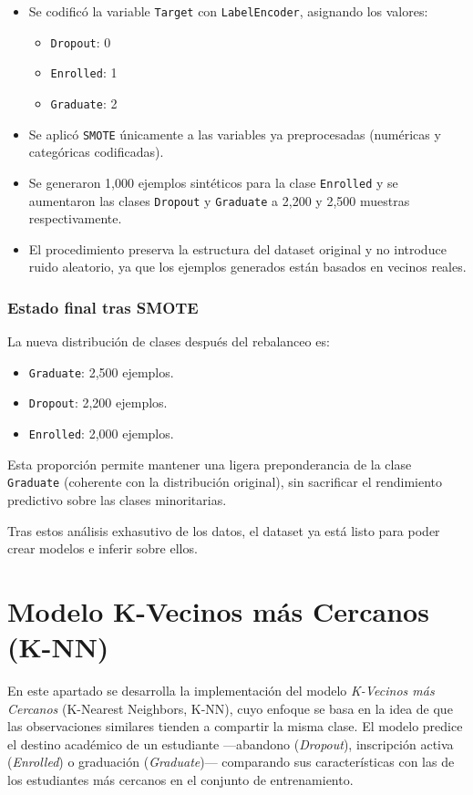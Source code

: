 \documentclass{report}[14pt]
\begin{document}
\begin{itemize}
    \item Se codificó la variable \texttt{Target} con \texttt{LabelEncoder}, asignando los valores:
    \begin{itemize}
        \item \texttt{Dropout}: 0
        \item \texttt{Enrolled}: 1
        \item \texttt{Graduate}: 2
    \end{itemize}
    \item Se aplicó \texttt{SMOTE} únicamente a las variables ya preprocesadas (numéricas y categóricas codificadas).
    \item Se generaron 1,000 ejemplos sintéticos para la clase \texttt{Enrolled} y se aumentaron las clases \texttt{Dropout} y \texttt{Graduate} a 2,200 y 2,500 muestras respectivamente.
    \item El procedimiento preserva la estructura del dataset original y no introduce ruido aleatorio, ya que los ejemplos generados están basados en vecinos reales.
\end{itemize}

\subsection{Estado final tras SMOTE}

La nueva distribución de clases después del rebalanceo es:

\begin{itemize}
    \item \texttt{Graduate}: 2,500 ejemplos.
    \item \texttt{Dropout}: 2,200 ejemplos.
    \item \texttt{Enrolled}: 2,000 ejemplos.
\end{itemize}

Esta proporción permite mantener una ligera preponderancia de la clase \texttt{Graduate} (coherente con la distribución original), sin sacrificar el rendimiento predictivo sobre las clases minoritarias.

Tras estos análisis exhasutivo de los datos, el dataset ya está listo para poder crear modelos e inferir sobre ellos.
\chapter{Modelo K-Vecinos más Cercanos (K-NN)}

En este apartado se desarrolla la implementación del modelo \textit{K-Vecinos más Cercanos} (K-Nearest Neighbors, K-NN), cuyo enfoque se basa en la idea de que las observaciones similares tienden a compartir la misma clase. El modelo predice el destino académico de un estudiante —abandono (\textit{Dropout}), inscripción activa (\textit{Enrolled}) o graduación (\textit{Graduate})— comparando sus características con las de los estudiantes más cercanos en el conjunto de entrenamiento.
\end{document}
